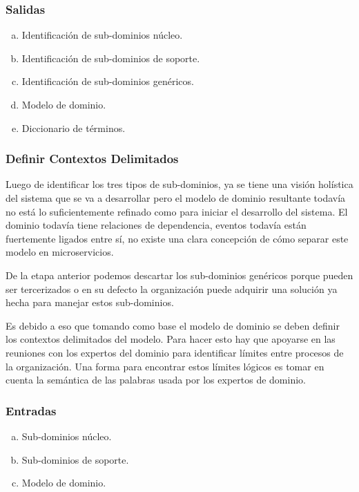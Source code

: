 \subsubsection*{Salidas}
\begin{enumerate}[a.]
    \item Identificación de sub-dominios núcleo.
    \item Identificación de sub-dominios de soporte.
    \item Identificación de sub-dominios genéricos.
    \item Modelo de dominio.
    \item Diccionario de términos.
\end{enumerate}


\subsubsection{Definir Contextos Delimitados}
Luego de identificar los tres tipos de sub-dominios, ya se tiene una visión holística
del sistema que se va a desarrollar pero el modelo de dominio resultante todavía no está
lo suficientemente refinado como para iniciar el desarrollo del sistema.
El dominio todavía tiene relaciones de dependencia, eventos todavía están fuertemente ligados
entre sí, no existe una clara concepción de cómo separar este modelo en microservicios.

De la etapa anterior podemos descartar los sub-dominios genéricos porque pueden ser tercerizados
o en su defecto la organización puede adquirir una solución ya hecha para manejar estos sub-dominios.

Es debido a eso que tomando como base el modelo de dominio se deben definir los contextos delimitados
del modelo.
Para hacer esto hay que apoyarse en las reuniones con los expertos del dominio para identificar
límites entre procesos de la organización.
Una forma para encontrar estos límites lógicos es tomar en cuenta la semántica de las palabras usada por los 
expertos de dominio.

\subsubsection*{Entradas}
\begin{enumerate}[a.]
	\item Sub-dominios núcleo.
	\item Sub-dominios de soporte.
	\item Modelo de dominio.
\end{enumerate}

